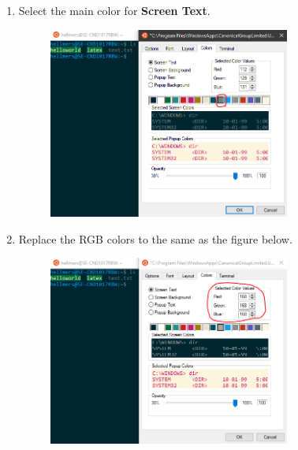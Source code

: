 \begin{enumerate}[a)]
\begin{enumerate}[1.]
        \item Select the main color for \textbf{Screen Text}.
        \begin{figure}[H]
            \centering
            \includegraphics[width=0.75\textwidth]{tex/WSL/Ubuntu_terminal_colors/Figures/13.PNG}
        \end{figure}
        
        \item Replace the RGB colors to the same as the figure below.
        \begin{figure}[H]
            \centering
            \includegraphics[width=0.75\textwidth]{tex/WSL/Ubuntu_terminal_colors/Figures/14.PNG}
        \end{figure}
        

\end{enumerate}
\end{enumerate}
